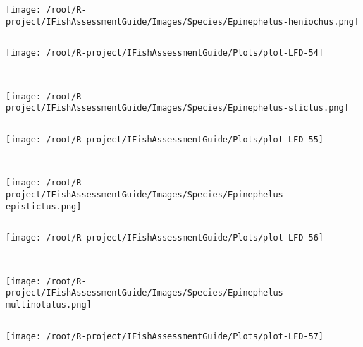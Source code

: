 \begin{knitrout}
\begin{kframe}
\begin{verbatim}
\end{verbatim}
\end{kframe}
\texttt{[image: /root/R-project/IFishAssessmentGuide/Images/Species/Epinephelus-heniochus.png]}
\begin{kframe}\begin{verbatim}
\end{verbatim}
\end{kframe}
\texttt{[image: /root/R-project/IFishAssessmentGuide/Plots/plot-LFD-54]} 
\begin{kframe}\begin{verbatim}
 
\end{verbatim}
\end{kframe}
\texttt{[image: /root/R-project/IFishAssessmentGuide/Images/Species/Epinephelus-stictus.png]}
\begin{kframe}\begin{verbatim}
\end{verbatim}
\end{kframe}
\texttt{[image: /root/R-project/IFishAssessmentGuide/Plots/plot-LFD-55]} 
\begin{kframe}\begin{verbatim}
 
\end{verbatim}
\end{kframe}
\texttt{[image: /root/R-project/IFishAssessmentGuide/Images/Species/Epinephelus-epistictus.png]}
\begin{kframe}\begin{verbatim}
\end{verbatim}
\end{kframe}
\texttt{[image: /root/R-project/IFishAssessmentGuide/Plots/plot-LFD-56]} 
\begin{kframe}\begin{verbatim}
 
\end{verbatim}
\end{kframe}
\texttt{[image: /root/R-project/IFishAssessmentGuide/Images/Species/Epinephelus-multinotatus.png]}
\begin{kframe}\begin{verbatim}
\end{verbatim}
\end{kframe}
\texttt{[image: /root/R-project/IFishAssessmentGuide/Plots/plot-LFD-57]} 
\begin{kframe}\begin{verbatim}
 

\end{verbatim}
\end{kframe}
\end{knitrout}
